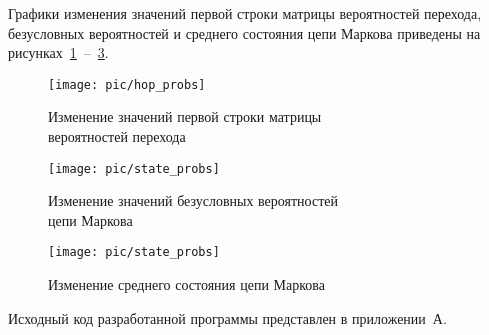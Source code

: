 \newpage

Графики изменения значений первой строки матрицы вероятностей перехода,
безусловных вероятностей и среднего состояния цепи Маркова приведены на
рисунках~\ref{pic:hop_probs}~--~\ref{pic:state_probs}.

\begin{figure}[h!]
  \centering
  \texttt{[image: pic/hop\_probs]}
  \caption{Изменение значений первой строки матрицы \\ вероятностей перехода}
  \label{pic:hop_probs}
\end{figure}

\begin{figure}[h!]
  \centering
  \texttt{[image: pic/state\_probs]}
  \caption{Изменение значений безусловных вероятностей \\ цепи Маркова}
  \label{pic:state_probs}
\end{figure}

\newpage

\begin{figure}[h!]
  \centering
  \texttt{[image: pic/state\_probs]}
  \caption{Изменение среднего состояния цепи Маркова}
  \label{pic:state_probs}
\end{figure}

Исходный код разработанной программы представлен в приложении~А.
